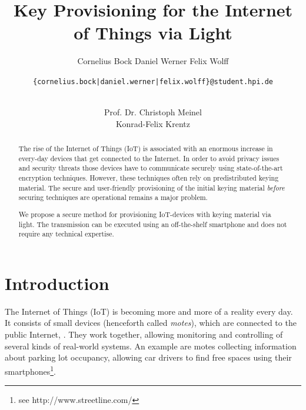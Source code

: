\documentclass{sig-alternate} %
\begin{document}
\title{Key Provisioning for the Internet of Things via Light}


\author{
\alignauthor
Cornelius Bock
%
\alignauthor
Daniel Werner
%
\alignauthor
Felix Wolff
%
\and
\texttt{\{cornelius.bock|daniel.werner|felix.wolff\}@student.hpi.de} \\ \\
\and
\alignauthor
Prof. Dr. Christoph Meinel\\
%
\alignauthor
Konrad-Felix Krentz\\
}
\toappear{}
\maketitle

\begin{abstract}
The rise of the Internet of Things (IoT) is associated with an enormous increase in every-day devices that get connected to the Internet.
In order to avoid privacy issues and security threats those devices have to communicate securely using state-of-the-art encryption techniques.
However, these techniques often rely on predistributed keying material.
The secure and user-friendly provisioning of the initial keying material \textit{before} securing techniques are operational remains a major problem.

We propose a secure method for provisioning IoT-devices with keying material via light.
The transmission can be executed using an off-the-shelf smartphone and does not require any technical expertise.
\end{abstract}




\section{Introduction}
\label{sec:introduction}

The Internet of Things (IoT) is becoming more and more of a reality every day.
It consists of small devices (henceforth called \textit{motes}), which are connected to the public Internet, \cite{atzori2010internet}.
They work together, allowing monitoring and controlling of several kinds of real-world systems.
An example are motes collecting information about parking lot occupancy, allowing car drivers to find free spaces using their smartphones\footnote{see http://www.streetline.com/}.
\end{document}
